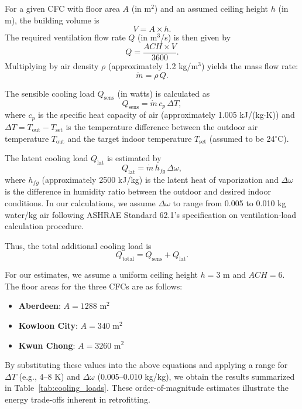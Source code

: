 \documentclass[preprint,12pt]{elsarticle}
\begin{document}
For a given CFC with floor area $A$ (in m$^2$) and an assumed ceiling height $h$ (in m), the building volume is
\[
V = A \times h.
\]
The required ventilation flow rate $Q$ (in m$^3$/s) is then given by
\[
Q = \frac{ACH \times V}{3600}.
\]
Multiplying by air density $\rho$ (approximately 1.2 kg/m$^3$) yields the mass flow rate:
\[
\dot{m} = \rho\, Q.
\]

The sensible cooling load $Q_{\text{sens}}$ (in watts) is calculated as
\[
Q_{\text{sens}} = \dot{m}\, c_p\, \Delta T,
\]
where $c_p$ is the specific heat capacity of air (approximately 1.005 kJ/(kg$\cdot$K)) and $\Delta T = T_{\text{out}} - T_{\text{set}}$ is the temperature difference between the outdoor air temperature $T_{\text{out}}$ and the target indoor temperature $T_{\text{set}}$ (assumed to be 24$^\circ$C).

The latent cooling load $Q_{\text{lat}}$ is estimated by
\[
Q_{\text{lat}} = \dot{m}\, h_{fg}\, \Delta \omega,
\]
where $h_{fg}$ (approximately 2500 kJ/kg) is the latent heat of vaporization and $\Delta \omega$ is the difference in humidity ratio between the outdoor and desired indoor conditions. In our calculations, we assume $\Delta \omega$ to range from 0.005 to 0.010 kg water/kg air following ASHRAE Standard 62.1's specification on ventilation‑load calculation procedure\cite{ashrae2022}.

Thus, the total additional cooling load is
\[
Q_{\text{total}} = Q_{\text{sens}} + Q_{\text{lat}}.
\]

For our estimates, we assume a uniform ceiling height $h = 3$ m and $ACH = 6$. The floor areas for the three CFCs are as follows:
\begin{itemize}
    \item \textbf{Aberdeen}: $A = 1288$ m$^2$
    \item \textbf{Kowloon City}: $A = 340$ m$^2$
    \item \textbf{Kwun Chong}: $A = 3260$ m$^2$
\end{itemize}

By substituting these values into the above equations and applying a range for $\Delta T$ (e.g., 4--8 K) and $\Delta \omega$ (0.005--0.010 kg/kg), we obtain the results summarized in Table~\ref{tab:cooling_loads}. These order-of-magnitude estimates illustrate the energy trade-offs inherent in retrofitting.

\begin{table}[htbp]
\centering
\caption{Estimated Additional Cooling Loads for Retrofitted CFCs.}
\label{tab:cooling_loads}
\end{table}
\end{document}
